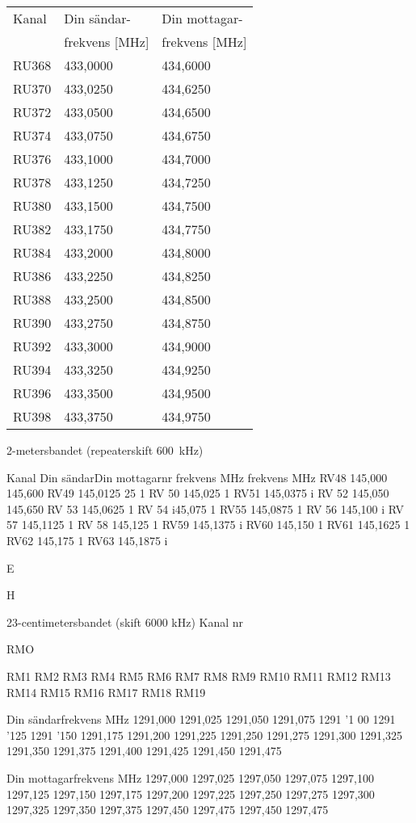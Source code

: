 \begin{tabular}{ l | l | l }
  Kanal & Din sändar- & Din mottagar- \\
        & frekvens [MHz] & frekvens [MHz] \\
  \hline
  RU368 & 433,0000 & 434,6000 \\
  RU370 & 433,0250 & 434,6250 \\
  RU372 & 433,0500 & 434,6500 \\
  RU374 & 433,0750 & 434,6750 \\
  RU376 & 433,1000 & 434,7000 \\
  RU378 & 433,1250 & 434,7250 \\
  RU380 & 433,1500 & 434,7500 \\
  RU382 & 433,1750 & 434,7750 \\
  RU384 & 433,2000 & 434,8000 \\
  RU386 & 433,2250 & 434,8250 \\
  RU388 & 433,2500 & 434,8500 \\
  RU390 & 433,2750 & 434,8750 \\
  RU392 & 433,3000 & 434,9000 \\
  RU394 & 433,3250 & 434,9250 \\
  RU396 & 433,3500 & 434,9500 \\
  RU398 & 433,3750 & 434,9750 \\
\end{tabular}

2-metersbandet (repeaterskift 600~kHz)

Kanal
Din sändarDin mottagarnr
frekvens MHz
frekvens MHz
RV48
145,000
145,600
RV49
145,0125
25
1
RV 50
145,025
1
RV51
145,0375
i
RV 52
145,050
145,650
RV 53
145,0625
1
RV 54
i45,075
1
RV55
145,0875
1
RV 56
145,100
i
RV 57
145,1125
1
RV 58
145,125
1
RV59
145,1375
i
RV60
145,150
1
RV61
145,1625
1
RV62
145,175
1
RV63
145,1875
i


E

H

23-centimetersbandet (skift 6000 kHz)
Kanal
nr

RMO

RM1
RM2
RM3
RM4
RM5
RM6
RM7
RM8
RM9
RM10
RM11
RM12
RM13
RM14
RM15
RM16
RM17
RM18
RM19

Din sändarfrekvens MHz
1291,000
1291,025
1291,050
1291,075
1291 '1 00
1291 '125
1291 '150
1291,175
1291,200
1291,225
1291,250
1291,275
1291,300
1291,325
1291,350
1291,375
1291,400
1291,425
1291,450
1291,475

Din mottagarfrekvens MHz
1297,000
1297,025
1297,050
1297,075
1297,100
1297,125
1297,150
1297,175
1297,200
1297,225
1297,250
1297,275
1297,300
1297,325
1297,350
1297,375
1297,450
1297,475
1297,450
1297,475

